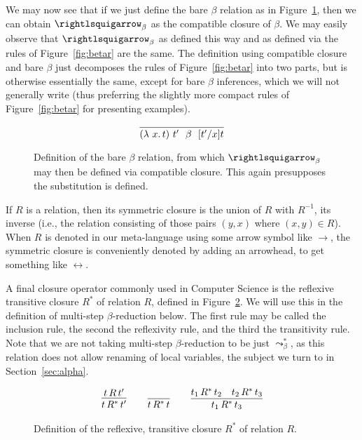 We may now see that if we just define the bare $\beta$ relation as in
Figure~\ref{fig:barebeta}, then we can obtain $\curva_\beta$ as the
compatible closure of $\beta$.  We may easily observe that
$\curva_\beta$ as defined this way and as defined via the rules of
Figure~\ref{fig:betar} are the same.  The definition using compatible
closure and bare $\beta$ just decomposes the rules of
Figure~\ref{fig:betar} into two parts, but is otherwise essentially
the same, except for bare $\beta$ inferences, which we will not generally
write (thus preferring the slightly more compact rules of Figure~\ref{fig:betar} for
presenting examples).

\begin{figure}
  \[
    \infer{(\lam{x}{t})\ t' \ \ \beta\ \ [t'/x]t}{\ }
  \]

  \caption{Definition of the bare $\beta$ relation, from which $\curva_\beta$ may then be defined
    via compatible closure.  This again presupposes the substitution is defined.}
\label{fig:barebeta}
\end{figure}

\begin{definition}
If $R$ is a relation, then its symmetric closure is the union of $R$ with $R^{-1}$, its inverse (i.e., the relation consisting
of those pairs $(y,x)$ where $(x,y) \in R$).  When $R$ is denoted in our
meta-language using some arrow symbol like $\to$, the symmetric closure is conveniently denoted by adding an arrowhead, to get
something like $\leftrightarrow$.
\end{definition}

A final closure operator commonly used in Computer Science is the reflexive transitive closure $R^*$ of relation $R$, defined in Figure~\ref{fig:rtcl}.
We will use this in the definition of multi-step $\beta$-reduction below.  The first rule may be called the inclusion rule,
the second the reflexivity rule, and the third the transitivity rule.
Note that we are not taking multi-step $\beta$-reduction
to be just $\leadsto_\beta^*$, as this relation does not allow renaming of local variables, the subject we turn to in Section~\ref{sec:alpha}.

\begin{figure}
  \[
  \begin{array}{lllllll}
    \infer{t\,R^*\,t'}{t\,R\,t'}&\,&
    \infer{t\,R^*\,t}{\,}&\,&
    \infer{t_1\,R^*\,t_3}{t_1\,R^*\,t_2 & t_2\,R^*\,t_3}
  \end{array}
  \]
  \caption{Definition of the reflexive, transitive closure $R^*$ of relation $R$.}
  \label{fig:rtcl}
  \end{figure}

